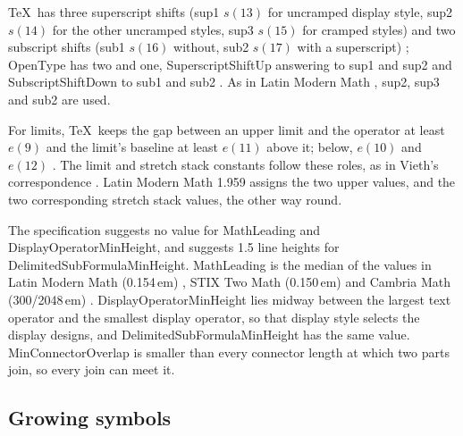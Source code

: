 \documentclass[10pt]{article}
\begin{document}
\TeX\ has three superscript shifts (sup1 $s(13)$ for uncramped display
style, sup2 $s(14)$ for the other uncramped styles, sup3 $s(15)$ for
cramped styles) and two subscript shifts (sub1
$s(16)$ without, sub2 $s(17)$ with a superscript)
\cite[\S700]{tex-program}; OpenType has two and one, SuperscriptShiftUp
answering to sup1 and sup2 and SubscriptShiftDown to sub1 and sub2
\cite[Table 5]{vieth}.  As in Latin Modern Math \cite{lm-math}, sup2,
sup3 and sub2 are used.

For limits, \TeX\ keeps the gap between an upper limit and the operator
at least $e(9)$ and the limit's baseline at least $e(11)$ above it; below,
$e(10)$ and $e(12)$ \cite[\S751]{tex-program}.  The limit and
stretch stack constants follow these roles, as in Vieth's
correspondence \cite[Tables 1--2]{vieth}.  Latin Modern Math 1.959
assigns the two upper values, and the two corresponding stretch stack
values, the other way round.

The specification suggests no value for MathLeading and
DisplayOperatorMinHeight, and suggests 1.5 line heights for
DelimitedSubFormulaMinHeight.  MathLeading is the median of the values
in Latin Modern Math (0.154\,em) \cite{lm-math}, STIX Two Math
(0.150\,em) \cite{stix-two} and Cambria Math (300/2048\,em)
\cite{cambria-math}.  DisplayOperatorMinHeight lies midway
between the largest text operator and the smallest display operator, so
that display style selects the display designs, and
DelimitedSubFormulaMinHeight has the same value.  MinConnectorOverlap
is smaller than every connector length at which two parts join, so
every join can meet it.

\subsection{Growing symbols}\label{sec:stretch}
\end{document}
